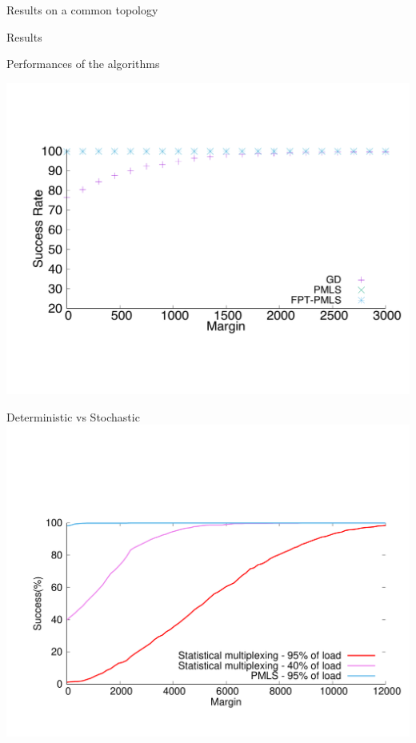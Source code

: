 \documentclass[10 pt]{beamer}
\begin{document}
\begin{section}{Results on a common topology}
\begin{subsection}{Results}

  \begin{frame}{Performances of the algorithms}
\centering

  \includegraphics[scale=0.45]{retour_21000.pdf}\\
  \end{frame}
  
    \begin{frame}{Deterministic vs Stochastic}
\centering
\vspace{-2cm}
  \includegraphics[scale=0.45]{stochastic.pdf}\\
  \end{frame}
\end{subsection}

\end{section}
\end{document}
